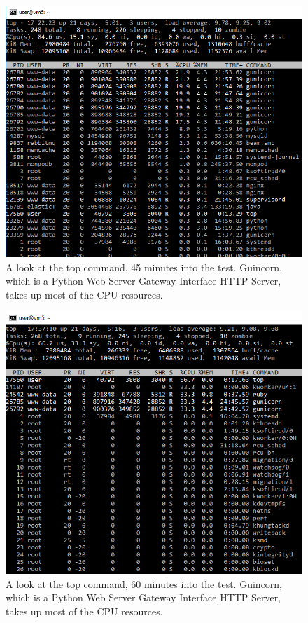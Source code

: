 \documentclass[12pt]{article}
\begin{document}
\begin{figure}[h!]
	\centering
	\includegraphics[width=\textwidth,height=\textheight,keepaspectratio]{intro/S3.png}
	\caption{A look at the top command, 45 minutes into the test. Guincorn, which is a Python Web Server Gateway Interface HTTP Server, takes up most of the CPU resources.}
\end{figure}

\begin{figure}[h!]
	\centering
	\includegraphics[width=\textwidth,height=\textheight,keepaspectratio]{intro/S4.png}
	\caption{A look at the top command, 60 minutes into the test. Guincorn, which is a Python Web Server Gateway Interface HTTP Server, takes up most of the CPU resources.}
\end{figure}
\clearpage
\end{document}

